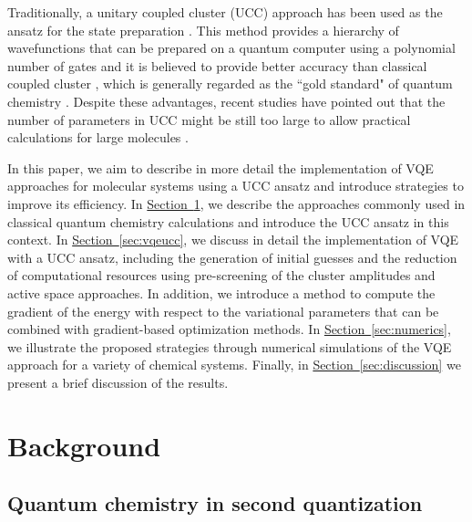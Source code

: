 \documentclass[superscriptaddress,aps,pra,twocolumn,nofootinbib,babel]{revtex4-1}
\renewcommand{\sec}[1]{\hyperref[sec:#1]{Section~\ref*{sec:#1}}}
\begin{document}
Traditionally, a unitary coupled cluster (UCC) approach has been used as the ansatz for the state preparation \cite{Peruzzo.NC.5.4213.2014,Yung.SR.4.3589.2014,Mcclean.NJP.18.023023.2016}. This method provides a hierarchy of wavefunctions that can be prepared on a quantum computer using a polynomial number of gates and it is believed to provide better accuracy than classical coupled cluster \cite{Kutzelnigg.1977.Chapter,Hoffmann.JCP.88.993.1988,Bartlett.CPL.155.133.1989,Cooper.JCP.133.234102.2010,Evangelista.JCP.134.224102.2011}, which is generally regarded as the ``gold standard" of quantum chemistry \cite{Bartlett.RMP.79.291.2007}. Despite these advantages, recent studies have pointed out that the number of parameters in UCC might be still too large to allow practical calculations for large molecules \cite{Wecker.PRA.92.042303.2015}. 

In this paper, we aim to describe in more detail the implementation of VQE approaches for molecular systems using a UCC ansatz and introduce strategies to improve its efficiency. In \sec{TheoryBackground}, we describe the approaches commonly used in classical quantum chemistry calculations and introduce the UCC ansatz in this context. In \sec{vqeucc}, we discuss in detail the implementation of VQE with a UCC ansatz, including the generation of initial guesses and the reduction of computational resources using pre-screening of the cluster amplitudes and active space approaches. In addition, we introduce a method to compute the gradient of the energy with respect to the variational parameters that can be combined with gradient-based optimization methods. In \sec{numerics}, we illustrate the proposed strategies through numerical simulations of the VQE approach for a variety of chemical systems. Finally, in \sec{discussion} we present a brief discussion of the results.

\section{Background}\label{sec:TheoryBackground}

\subsection{Quantum chemistry in second quantization}
\end{document}
